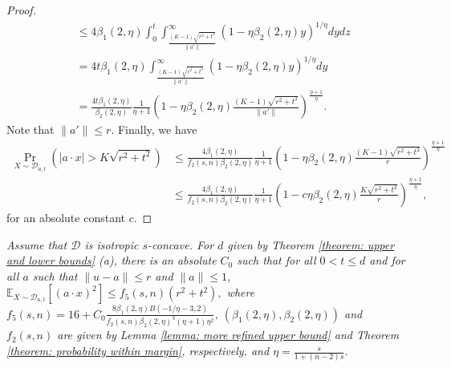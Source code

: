 \documentclass[11pt]{article}
\newcommand{\cD}{\mathcal{D}}
\newcommand{\E}{\mathbb{E}}
\begin{document}
{{{{\begin{proof}
\begin{equation}
\begin{split}
&\le 4\beta_1(2,\eta)\int_0^t\int_{\frac{(K-1)\sqrt{r^2+t^2}}{\|a'\|}}^\infty (1-\eta\beta_2(2,\eta)y)^{1/\eta} dydz\\
&=4t\beta_1(2,\eta)\int_{\frac{(K-1)\sqrt{r^2+t^2}}{\|a'\|}}^\infty (1-\eta\beta_2(2,\eta)y)^{1/\eta} dy\\
&=\frac{4t\beta_1(2,\eta)}{\beta_2(2,\eta)}\frac{1}{\eta+1}\left(1-\eta\beta_2(2,\eta)\frac{(K-1)\sqrt{r^2+t^2}}{\|a'\|}\right)^{\frac{\eta+1}{\eta}}.
\end{split}
\end{equation}
Note that $\|a'\|\le r$. Finally, we have
\begin{equation*}
\begin{split}
\Pr_{X\sim \cD_{u,t}}(|a\cdot x|> K\sqrt{r^2+t^2})&\le \frac{4\beta_1(2,\eta)}{f_2(s,n)\beta_2(2,\eta)}\frac{1}{\eta+1}\left(1-\eta\beta_2(2,\eta)\frac{(K-1)\sqrt{r^2+t^2}}{r}\right)^{\frac{\eta+1}{\eta}}\\
&\le \frac{4\beta_1(2,\eta)}{f_2(s,n)\beta_2(2,\eta)}\frac{1}{\eta+1}\left(1-c\eta\beta_2(2,\eta)\frac{K\sqrt{r^2+t^2}}{r}\right)^{\frac{\eta+1}{\eta}},
\end{split}
\end{equation*}
for an absolute constant $c$.
\end{proof}

\emph{Assume that $\cD$ is isotropic $s$-concave. For $d$ given by Theorem \ref{theorem: upper and lower bounds} (a), there is an absolute $C_0$ such that for all $0<t\le d$ and for all $a$ such that $\|u-a\|\le r$ and $\|a\|\le 1$,
$
\E_{X\sim \cD_{u,t}}[(a\cdot x)^2]\le f_5(s,n)(r^2+t^2),
$
where $f_5(s,n)=16+C_0\frac{8\beta_1(2,\eta)B(-1/\eta-3,2)}{f_2(s,n)\beta_2(2,\eta)^3(\eta+1)\eta^2}$, $(\beta_1(2,\eta), \beta_2(2,\eta))$ and $f_2(s,n)$ are given by Lemma \ref{lemma: more refined upper bound} and Theorem \ref{theorem: probability within margin}, respectively, and $\eta=\frac{s}{1+(n-2)s}$.}

}}}}
\end{document}
